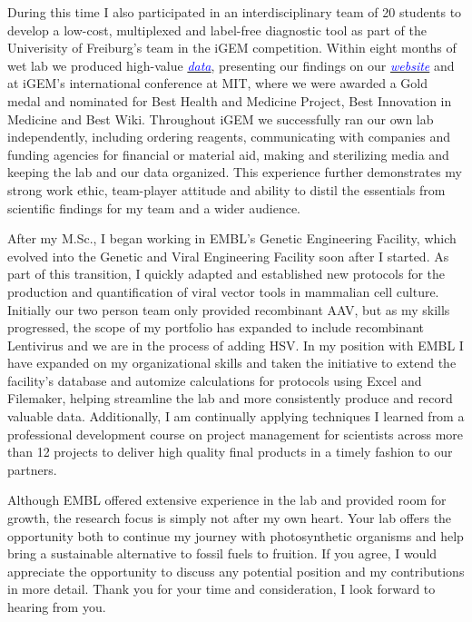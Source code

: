 \documentclass[11pt,a4paper,sans]{moderncv}
\begin{document}
\begin{spacing}{1.2}
During this time I also participated in an interdisciplinary team of 20 students to develop a low-cost, multiplexed and label-free diagnostic tool as part of the Univerisity of Freiburg's team in the iGEM competition.
Within eight months of wet lab we produced high-value {\href{https://www.ncbi.nlm.nih.gov/pubmed/29803867}{\textcolor{blue}{\textit{data}}}}, presenting our findings on our {\href{http://2015.igem.org/Team:Freiburg}{\textcolor{blue}{\textit{website}}}} and at iGEM's international conference at MIT, where we were awarded a Gold medal and nominated for Best Health and Medicine Project, Best Innovation in Medicine and Best Wiki.
Throughout iGEM we successfully ran our own lab independently, including ordering reagents, communicating with companies and funding agencies for financial or material aid, making and sterilizing media and keeping the lab and our data organized. 
This experience further demonstrates my strong work ethic, team-player attitude and ability to distil the essentials from scientific findings for my team and a wider audience.\par\vspace*{3mm}
		
After my M.Sc., I began working in EMBL's Genetic Engineering Facility, which evolved into the Genetic and Viral Engineering Facility soon after I started. 
As part of this transition, I quickly adapted and established new protocols for the production and quantification of viral vector tools in mammalian cell culture. 			
Initially our two person team only provided recombinant AAV, but as my skills progressed, the scope of my portfolio has expanded to include recombinant Lentivirus and we are in the process of adding HSV.
In my position with EMBL I have expanded on my organizational skills and taken the initiative to extend the facility's database and automize calculations for protocols using Excel and Filemaker, helping streamline the lab and more consistently produce and record valuable data.
Additionally, I am continually applying techniques I learned from a professional development course on project management for scientists across more than 12 projects to deliver high quality final products in a timely fashion to our partners.\par\vspace*{3mm}

Although EMBL offered extensive experience in the lab and provided room for growth, the research focus is simply not after my own heart.
Your lab offers the opportunity both to continue my journey with photosynthetic organisms and help bring a sustainable alternative to fossil fuels to fruition. 
If you agree, I would appreciate the opportunity to discuss any potential position and my contributions in more detail. 
Thank you for your time and consideration, I look forward to hearing from you.
 
\vspace{5mm}
\end{spacing}
\makeletterclosing
\end{document}
